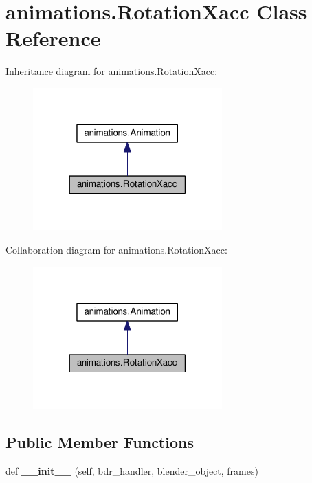 \hypertarget{classanimations_1_1RotationXacc}{}\section{animations.\+Rotation\+Xacc Class Reference}
\label{classanimations_1_1RotationXacc}


Inheritance diagram for animations.\+Rotation\+Xacc\+:\nopagebreak
\begin{figure}[H]
\begin{center}
\leavevmode
\includegraphics[width=206pt]{classanimations_1_1RotationXacc__inherit__graph}
\end{center}
\end{figure}


Collaboration diagram for animations.\+Rotation\+Xacc\+:\nopagebreak
\begin{figure}[H]
\begin{center}
\leavevmode
\includegraphics[width=206pt]{classanimations_1_1RotationXacc__coll__graph}
\end{center}
\end{figure}
\subsection*{Public Member Functions}
\begin{DoxyCompactItemize}
\item 
def {\bfseries \+\_\+\+\_\+init\+\_\+\+\_\+} (self, bdr\+\_\+handler, blender\+\_\+object, frames)\hypertarget{classanimations_1_1RotationXacc_a4caf5eee56e20df906754de30f9cc213}{}\label{classanimations_1_1RotationXacc_a4caf5eee56e20df906754de30f9cc213}

\end{DoxyCompactItemize}
